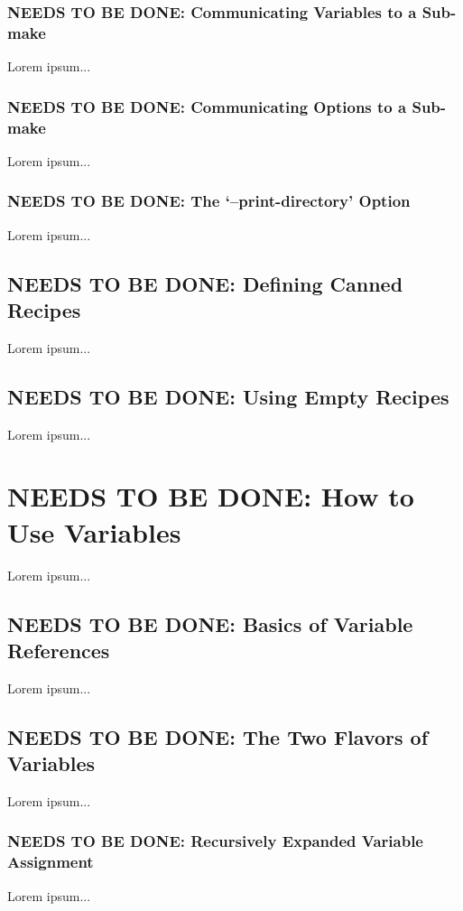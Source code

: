 \documentclass{charun}
\begin{document}
\begin{multicols*}{2}
\color{gray}
\subsubsection{NEEDS TO BE DONE: Communicating Variables to a Sub-make}
Lorem ipsum...
\color{black}

\color{gray}
\subsubsection{NEEDS TO BE DONE: Communicating Options to a Sub-make}
Lorem ipsum...
\color{black}

\color{gray}
\subsubsection{NEEDS TO BE DONE: The ‘--print-directory’ Option}
Lorem ipsum...
\color{black}

\color{gray}
\subsection{NEEDS TO BE DONE: Defining Canned Recipes}
Lorem ipsum...
\color{black}

\color{gray}
\subsection{NEEDS TO BE DONE: Using Empty Recipes}
Lorem ipsum...
\color{black}


\color{gray}
\section{NEEDS TO BE DONE: How to Use Variables}
Lorem ipsum...
\color{black}


\color{gray}
\subsection{NEEDS TO BE DONE: Basics of Variable References}
Lorem ipsum...
\color{black}

\color{gray}
\subsection{NEEDS TO BE DONE: The Two Flavors of Variables}
Lorem ipsum...
\color{black}

\color{gray}
\subsubsection{NEEDS TO BE DONE: Recursively Expanded Variable Assignment}
Lorem ipsum...
\color{black}


\end{multicols*}
\end{document}
